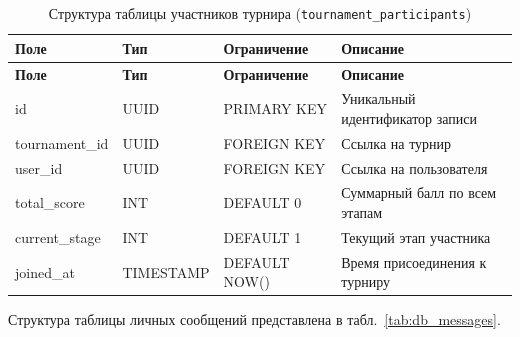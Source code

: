 \begin{longtable}{|l|l|p{3.5cm}|p{5.5cm}|}
	\caption{Структура таблицы участников турнира (\texttt{tournament\_participants})} \label{tab:db_tournament_participants} \\

	\hline
	\textbf{Поле}      & \textbf{Тип} & \textbf{Ограничение} & \textbf{Описание}                        \\ \hline
	\endfirsthead

	\tabcont{\ref{tab:db_tournament_participants}}
	\textbf{Поле}      & \textbf{Тип} & \textbf{Ограничение} & \textbf{Описание}                        \\ \hline
	\endhead

	\hline
	\endfoot

	\hline
	\endlastfoot

	id                 & UUID         & PRIMARY KEY          & Уникальный идентификатор записи          \\ \hline
	tournament\_id     & UUID         & FOREIGN KEY          & Ссылка на турнир                         \\ \hline
	user\_id           & UUID         & FOREIGN KEY          & Ссылка на пользователя                   \\ \hline
	total\_score       & INT          & DEFAULT 0            & Суммарный балл по всем этапам            \\ \hline
	current\_stage     & INT          & DEFAULT 1            & Текущий этап участника                   \\ \hline
	joined\_at         & TIMESTAMP    & DEFAULT NOW()        & Время присоединения к турниру            \\ \hline
\end{longtable}

Структура таблицы личных сообщений представлена в табл.~\ref{tab:db_messages}.

